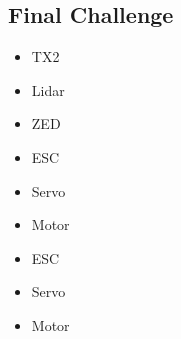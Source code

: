 \documentclass[]{article}
\begin{document}
\subsection{Final Challenge}
\begin{itemize}  
	\item TX2
\item Lidar
\item ZED
\item ESC
\item Servo
\item Motor
\item ESC
\item Servo
\item Motor
\end{itemize}
\end{document}
